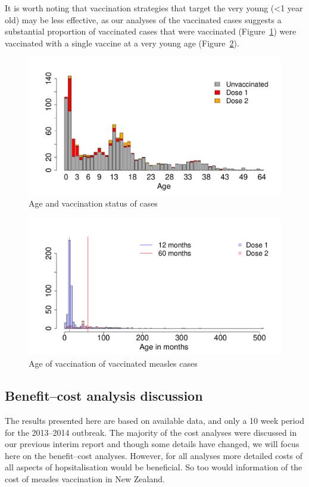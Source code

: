 \documentclass{article}
\begin{document}
It is worth noting that vaccination strategies that target the very young (<1 year old) may be less effective, as our analyses of the vaccinated cases suggests a substantial proportion of vaccinated cases that were vaccinated (Figure~\ref{fig:ageandvac}) were vaccinated with a single vaccine at a very young age (Figure~\ref{fig:vaccstat}).

\begin{figure}[h!]
\begin{center}
\includegraphics{interimreport2-038}
\end{center}
\caption{Age and vaccination status of cases}
\label{fig:ageandvac}
\end{figure}

\begin{figure}[h!]
\begin{center}
\includegraphics{interimreport2-039}
\end{center}
\caption{Age of vaccination of vaccinated measles cases}
\label{fig:vaccstat}
\end{figure}

\subsection{Benefit--cost analysis discussion}
The results presented here are based on available data, and only a 10 week period for the 2013--2014 outbreak. The majority of the cost analyses were discussed in our previous interim report and though some details have changed, we will focus here on the benefit--cost analyses. However, for all analyses more detailed costs of all aspects of hopsitalisation would be beneficial. So too would information of the cost of measles vaccination in New Zealand.
\end{document}

